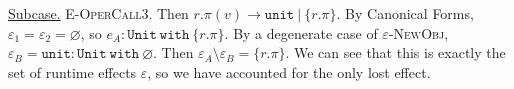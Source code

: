 \documentclass{llncs}
\newcommand{\keywadj}[1]{\mathtt{#1}}
\newcommand{\keyw}[1]{\keywadj{#1}~}
\newcommand{\subcase}[1] {
	\begin{adjustwidth}{2.2em}{0pt}
		\underline{Subcase.} #1
	\end{adjustwidth}
}
\begin{document}
{{	\subcase{ \textsc{E-OperCall3}. Then $r.\pi(v) \longrightarrow \keywadj{unit}~|~\{ r.\pi \}$. By Canonical Forms, $\varepsilon_1 = \varepsilon_2 = \varnothing$, so $e_A : \keyw{Unit~with} \{ r.\pi \}$. By a degenerate case of \textsc{$\varepsilon$-NewObj}, $\varepsilon_B = \keywadj{unit} : \keyw{Unit~with} \varnothing$. Then $\varepsilon_A \setminus \varepsilon_B = \{ r.\pi \}$. We can see that this is exactly the set of runtime effects $\varepsilon$, so we have accounted for the only lost effect.\\}	
}
}
\end{document}
